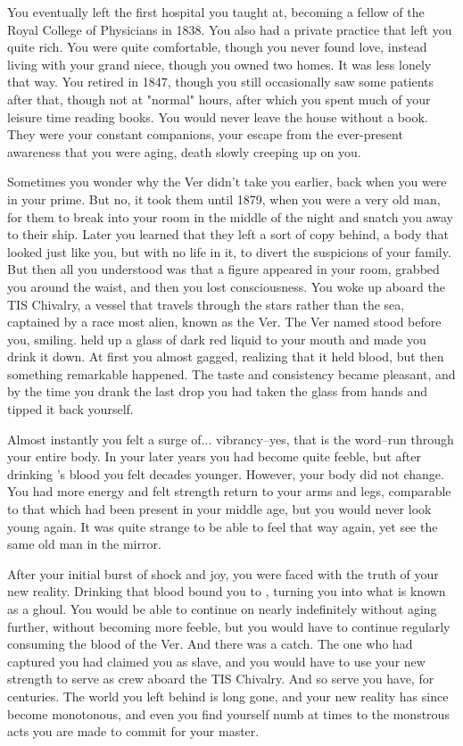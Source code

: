 \documentclass[char]{guildcamp4}
\begin{document}
You eventually left the first hospital you taught at, becoming a fellow of the Royal College of Physicians in 1838. You also had a private practice that left you quite rich. You were quite comfortable, though you never found love, instead living with your grand niece, though you owned two homes. It was less lonely that way. You retired in 1847, though you still occasionally saw some patients after that, though not at "normal" hours, after which you spent much of your leisure time reading books. You would never leave the house without a book. They were your constant companions, your escape from the ever-present awareness that you were aging, death slowly creeping up on you.

Sometimes you wonder why the Ver didn't take you earlier, back when you were in your prime. But no, it took them until 1879, when you were a very old man, for them to break into your room in the middle of the night and snatch you away to their ship. Later you learned that they left a sort of copy behind, a body that looked just like you, but with no life in it, to divert the suspicions of your family. But then all you understood was that a figure appeared in your room, grabbed you around the waist, and then you lost consciousness. You woke up aboard the TIS Chivalry, a vessel that travels through the stars rather than the sea, captained by a race most alien, known as the Ver. The Ver named \cVone{} stood before you, smiling. \cVone{\They} held up a glass of dark red liquid to your mouth and made you drink it down. At first you almost gagged, realizing that it held blood, but then something remarkable happened. The taste and consistency became pleasant, and by the time you drank the last drop you had taken the glass from \cVone{\their} hands and tipped it back yourself.

Almost instantly you felt a surge of... vibrancy--yes, that is the word--run through your entire body. In your later years you had become quite feeble, but after drinking \cVone{}'s blood you felt decades younger. However, your body did not change. You had more energy and felt strength return to your arms and legs, comparable to that which had been present in your middle age, but you would never look young again. It was quite strange to be able to feel that way again, yet see the same old man in the mirror.

After your initial burst of shock and joy, you were faced with the truth of your new reality. Drinking that blood bound you to \cVone{}, turning you into what is known as a ghoul. You would be able to continue on nearly indefinitely without aging further, without becoming more feeble, but you would have to continue regularly consuming the blood of the Ver. And there was a catch. The one who had captured you had claimed you as \cVone{\their} slave, and you would have to use your new strength to serve as crew aboard the TIS Chivalry. And so serve you have, for centuries. The world you left behind is long gone, and your new reality has since become monotonous, and even you find yourself numb at times to the monstrous acts you are made to commit for your master.
\end{document}

